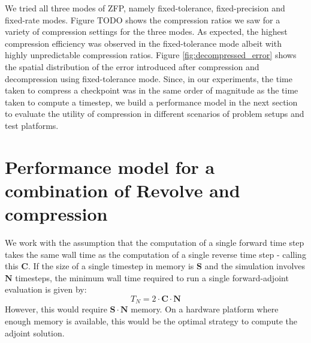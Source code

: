 \documentclass[conference]{IEEEtran}
\begin{document}
We tried all three modes of ZFP, namely fixed-tolerance, fixed-precision and fixed-rate modes. Figure TODO shows the compression ratios
we saw for a variety of compression settings for the three modes. As expected, the highest compression efficiency was
observed in the fixed-tolerance mode albeit with highly unpredictable compression ratios. Figure \ref{fig:decompressed_error} shows the
spatial distribution of the error introduced after compression and decompression using fixed-tolerance mode. Since, in our experiments, the time
taken to compress a checkpoint was in the same order of magnitude as the time taken to compute a timestep, we build a
performance model in the next section to evaluate the utility of compression in different scenarios of problem setups and test
platforms.



\section{Performance model for a combination of Revolve and compression}
\label{sec:performance_model}
We work with the assumption that the computation of a single forward time step takes the same wall time
as the computation of a single reverse time step - calling this $\mathbf{C}$. If the size of a single 
timestep in memory is $\mathbf{S}$ and the simulation involves $\mathbf{N}$ timesteps, the minimum
wall time required to run a single forward-adjoint evaluation is given by:
\begin{equation}
T_N = 2 \cdot \mathbf{C} \cdot \mathbf{N}
\end{equation}
However, this would require $\mathbf{S} \cdot \mathbf{N}$ memory. On a hardware platform where enough memory
is available, this would be the optimal strategy to compute the adjoint solution. 
\end{document}
